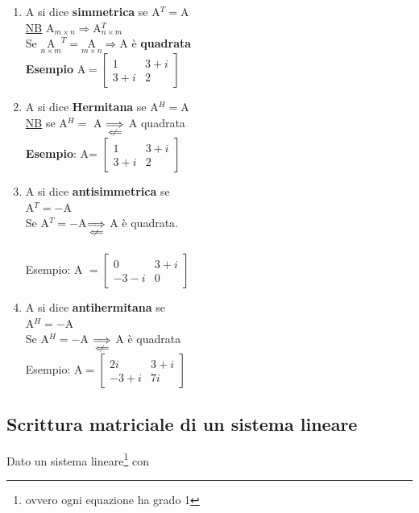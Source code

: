 \begin{enumerate}
    \item A si dice \textbf{simmetrica} se A$^T=$A\\
        \underline{NB} A$_{m\times  n}\Longrightarrow$A$^T_{n\times m}$\\
        Se $\underset{n\times m}{\textrm{A}}^T=\underset{m\times n}{\textrm{A}} \Longrightarrow$A è \textbf{quadrata}\\
        \textbf{Esempio} A$=
        \begin{bmatrix}
            1 & 3+i\\
            3+i & 2
        \end{bmatrix}
        $
    \item A si dice \textbf{Hermitana} se A$^H=$A\\
        \underline{NB} se A$^H=$ A $\underset{\centernot\Longleftarrow}{\Longrightarrow}$ A quadrata\\
        \textbf{Esempio}: A=
        $
        \begin{bmatrix}
            1 & 3+i\\
            3+i & 2
        \end{bmatrix}
        $
    \item A si dice \textbf{antisimmetrica} se \\
        A$^T=-$A\\
        Se A$^T=-$A$\underset{\centernot\Longleftarrow}{\Longrightarrow}$ A è quadrata. \\\\
        Esempio: A $=
        \begin{bmatrix}
            0 & 3+i\\
            -3-i & 0
        \end{bmatrix}
        $
    \item A si dice \textbf{antihermitana} se\\
        A$^H=-$A\\
        Se A$^H=-$A $\underset{\centernot\Longleftarrow}{\Longrightarrow}$ A è quadrata\\
        Esempio: A$=
        \begin{bmatrix}
            2i & 3+i\\
            -3+i & 7i
        \end{bmatrix}
        $
\end{enumerate}

\subsection{Scrittura matriciale di un sistema lineare}
Dato un sistema lineare\footnote{ovvero ogni equazione ha grado 1} con\\

